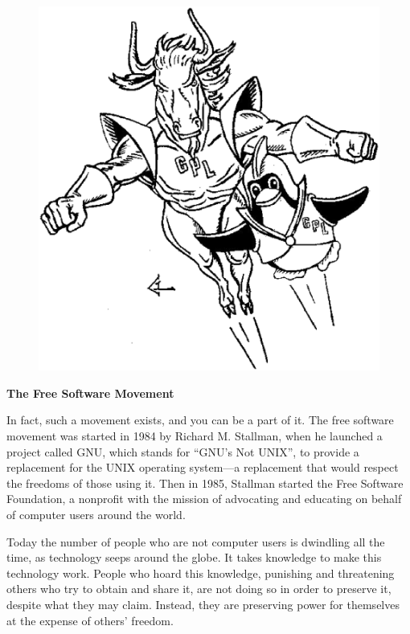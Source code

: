 \documentclass[twoside,12pt]{article}
\begin{document}
\begin{figure}
 \begin{center}
   \includegraphics[scale=0.23]{dynamic-duo-bw.eps}
 \end{center}
\end{figure}

\begin{center}
{\Large\bf The Free Software Movement}
\end{center}

In fact, such a movement exists, and you can be a part of it. The free software
movement was started in 1984 by Richard M. Stallman, when he launched a project
called GNU, which stands for ``GNU's Not UNIX'', to provide a replacement for
the UNIX operating system---a replacement that would respect the freedoms of
those using it. Then in 1985, Stallman started the Free Software Foundation, a
nonprofit with the mission of advocating and educating on behalf of computer
users around the world.

Today the number of people who are not computer users is dwindling all the
time, as technology seeps around the globe. It takes knowledge to make this
technology work. People who hoard this knowledge, punishing and threatening
others who try to obtain and share it, are not doing so in order to preserve
it, despite what they may claim. Instead, they are preserving power for
themselves at the expense of others' freedom.
\end{document}
